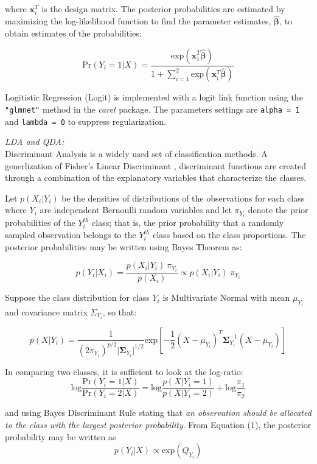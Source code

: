 \documentclass[12pt,]{article}
\begin{document}
where \(\mathbf{x}^T_i\) is the design matrix. The posterior
probabilities are estimated by maximizing the log-likelihood function to
find the parameter estimates, \(\hat{\boldsymbol{\beta}}\), to obtain
estimates of the probabilities:

\[
\text{Pr}(Y_i=1 \vert X) = \frac{ \text{exp}(\mathbf{x}^T_1 \hat{\boldsymbol{\beta}}) }{ 1 + \sum^2_{i=1} \text{exp}(\mathbf{x}^T_i \hat{\boldsymbol{\beta}}) }
\]

Logitistic Regression (Logit) is implemented with a logit link function
using the \texttt{"glmnet"} method in the \emph{caret} package. The
parameters settings are \texttt{alpha\ =\ 1} and \texttt{lambda\ =\ 0}
to suppress regularization.

\emph{LDA and QDA:}\\
Discriminant Analysis is a widely used set of classification methods. A
generlization of Fisher's Linear Discriminant
\autocite{fisher_use_1936}, discriminant functions are created through a
combination of the explanatory variables that characterize the classes.

Let \(p(X_i \vert Y_i)\) be the densities of distributions of the
observations for each class where \(Y_i\) are independent Bernoulli
random variables and let \(\pi_{Y_i}\) denote the prior probabilities of
the \(Y^{th}_i\) class; that is, the prior probability that a randomly
sampled observation belongs to the \(Y_i^{th}\) class based on the class
proportions. The posterior probabilities may be written using Bayes
Theorem as:

\[
p(Y_i \vert X_i) = \frac{p(X_i \vert Y_i) ~\pi_{Y_i}}{p(X_i)} \propto p(X_i \vert Y_i) ~\pi_{Y_i}   \tag{1}
\]

Suppose the class distribution for class \(Y_i\) is Multivariate Normal
with mean \(\mu_{Y_i}\) and covariance matrix \(\Sigma_{Y_i}\), so that:

\[
p(X \vert Y_i) = \frac{1}{(2 \pi_{Y_i})^{p/2} \vert\boldsymbol{\Sigma}_{Y_i} \vert ^{1/2}} \text{exp} \left[-\frac{1}{2}(X - \mu_{Y_i})^T \boldsymbol{\Sigma}^{-1}_{Y_i}(X - \mu_{Y_i})  \right]  \tag{2}
\]

In comparing two classes, it is sufficient to look at the log-ratio: \[
\text{log} \frac{\text{Pr}(Y_i=1 \vert X)}{\text{Pr}(Y_i=2 \vert X)} = \text{log}\frac{p(X \vert Y_i=1)}{p(X \vert Y_i=2)} + \text{log}\frac{\pi_1}{\pi_2}   \tag{3}
\]

and using Bayes Discriminant Rule stating that \emph{an observation
should be allocated to the class with the largest posterior
probability}. From Equation (1), the posterior probability may be
written as \[
p(Y_i \vert X) \propto \text{exp} \left( Q_{Y_i} \right)    \tag{4}
\]
\end{document}
